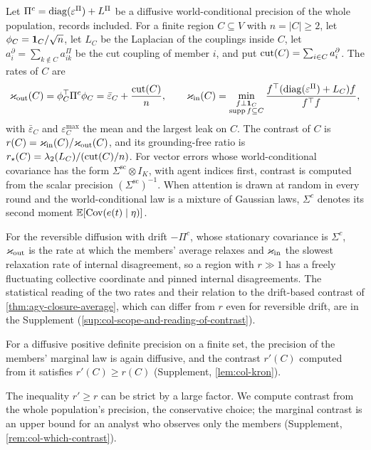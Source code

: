 \begin{definition}[Contrast]\label{def:col-contrast}
Let $\Pi^c=\operatorname{diag}(\varepsilon^\Pi)+L^\Pi$ be a diffusive world-conditional precision of the whole population, records included. For a finite region $C\subseteq V$ with $n=|C|\ge2$, let $\phi_C=\mathbf{1}_C/\sqrt n$, let $L_C$ be the Laplacian of the couplings inside $C$, let $a^\partial_i=\sum_{k\notin C}a^\Pi_{ik}$ be the cut coupling of member $i$, and put $\operatorname{cut}(C)=\sum_{i\in C}a^\partial_i$. The rates of $C$ are
\begin{equation}\label{eq:col-rates}
\varkappa_{\mathrm{out}}(C)=\phi_C^\top\Pi^c\phi_C=\bar\varepsilon_C+\frac{\operatorname{cut}(C)}{n},\qquad\varkappa_{\mathrm{in}}(C)=\min_{\substack{f\perp\mathbf{1}_C\\\operatorname{supp}f\subseteq C}}\frac{f^\top(\operatorname{diag}(\varepsilon^\Pi)+L_C)f}{f^\top f},
\end{equation}
with $\bar\varepsilon_C$ and $\varepsilon^{\max}_C$ the mean and the largest leak on $C$. The contrast of $C$ is $r(C)=\varkappa_{\mathrm{in}}(C)/\varkappa_{\mathrm{out}}(C)$, and its grounding-free ratio is $r_\star(C)=\lambda_2(L_C)/(\operatorname{cut}(C)/n)$. For vector errors whose world-conditional covariance has the form $\Sigma^{\mathrm{sc}}\otimes I_K$, with agent indices first, contrast is computed from the scalar precision $(\Sigma^{\mathrm{sc}})^{-1}$. When attention is drawn at random in every round and the world-conditional law is a mixture of Gaussian laws, $\Sigma^c$ denotes its second moment $\mathbb{E}[\operatorname{Cov}(e(t)\mid\eta)]$.
\end{definition}

For the reversible diffusion with drift $-\Pi^c$, whose stationary covariance is $\Sigma^c$, $\varkappa_{\mathrm{out}}$ is the rate at which the members' average relaxes and $\varkappa_{\mathrm{in}}$ the slowest relaxation rate of internal disagreement, so a region with $r\gg1$ has a freely fluctuating collective coordinate and pinned internal disagreements. The statistical reading of the two rates and their relation to the drift-based contrast of \cref{thm:agy-closure-average}, which can differ from $r$ even for reversible drift, are in the Supplement (\cref{sup:col-scope-and-reading-of-contrast}).

For a diffusive positive definite precision on a finite set, the precision of the members' marginal law is again diffusive, and the contrast $r'(C)$ computed from it satisfies $r'(C)\ge r(C)$ (Supplement, \cref{lem:col-kron}).

The inequality $r'\ge r$ can be strict by a large factor. We compute contrast from the whole population's precision, the conservative choice; the marginal contrast is an upper bound for an analyst who observes only the members (Supplement, \cref{rem:col-which-contrast}).

